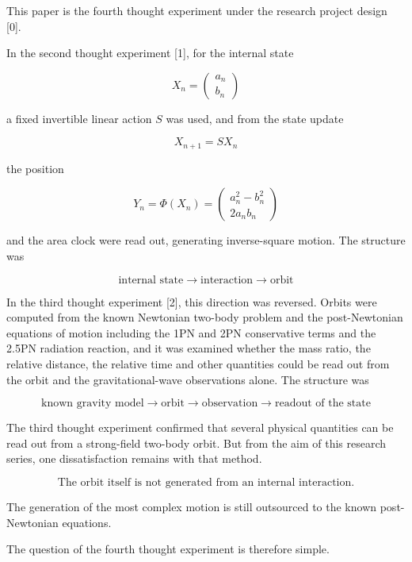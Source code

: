 \documentclass[
  a4paper,
]{article}
\begin{document}
This paper is the fourth thought experiment under the research project
design {[}0{]}.

In the second thought experiment {[}1{]}, for the internal state

\[
X_n=\begin{pmatrix}a_n\\b_n\end{pmatrix}
\]

a fixed invertible linear action \(S\) was used, and from the state
update

\[
X_{n+1}=SX_n
\]

the position

\[
Y_n=\Phi(X_n)
=\begin{pmatrix}
a_n^2-b_n^2\\
2a_nb_n
\end{pmatrix}
\]

and the area clock were read out, generating inverse-square motion. The
structure was

\[
\boxed{
\text{internal state}
\rightarrow
\text{interaction}
\rightarrow
\text{orbit}
}
\]

In the third thought experiment {[}2{]}, this direction was reversed.
Orbits were computed from the known Newtonian two-body problem and the
post-Newtonian equations of motion including the 1PN and 2PN
conservative terms and the 2.5PN radiation reaction, and it was examined
whether the mass ratio, the relative distance, the relative time and
other quantities could be read out from the orbit and the
gravitational-wave observations alone. The structure was

\[
\boxed{
\text{known gravity model}
\rightarrow
\text{orbit}
\rightarrow
\text{observation}
\rightarrow
\text{readout of the state}
}
\]

The third thought experiment confirmed that several physical quantities
can be read out from a strong-field two-body orbit. But from the aim of
this research series, one dissatisfaction remains with that method.

\[
\boxed{
\text{The orbit itself is not generated from an internal interaction.}
}
\]

The generation of the most complex motion is still outsourced to the
known post-Newtonian equations.

The question of the fourth thought experiment is therefore simple.

\begin{center}
\end{center}
\end{document}
